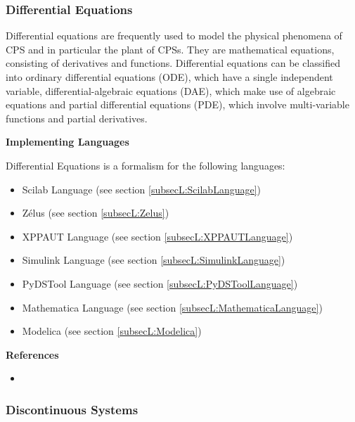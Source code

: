 \subsubsection{Differential Equations}
\label{subsecF:DifferentialEquations}


Differential equations are frequently used to model the physical phenomena of CPS and in particular the plant of CPSs. They are mathematical equations, consisting of derivatives and functions. Differential equations can be classified into ordinary differential equations (ODE), which have a single independent variable, differential-algebraic equations (DAE), which make use of algebraic equations and partial differential equations (PDE), which involve multi-variable functions and partial derivatives.

\textbf{Implementing Languages}

Differential Equations is a formalism for the following languages:
\begin{itemize}
	\item Scilab Language (see section \ref{subsecL:ScilabLanguage})
	\item Z\'elus (see section \ref{subsecL:Zelus})
	\item XPPAUT Language (see section \ref{subsecL:XPPAUTLanguage})
	\item Simulink Language (see section \ref{subsecL:SimulinkLanguage})
	\item PyDSTool Language (see section \ref{subsecL:PyDSToolLanguage})
	\item Mathematica Language (see section \ref{subsecL:MathematicaLanguage})
	\item Modelica (see section \ref{subsecL:Modelica})
\end{itemize}




\itemCpsUsage {}


\textbf{References}
\begin{itemize}
	
\item {}
\end{itemize}



\subsubsection{Discontinuous Systems}
\label{subsecF:DiscontinuousSystems}

